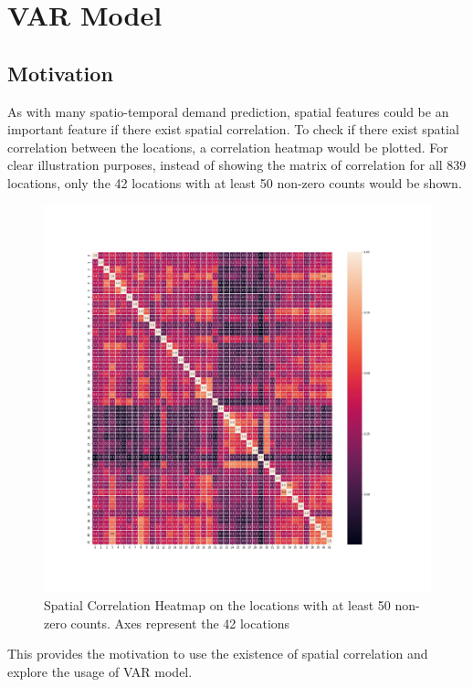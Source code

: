 \documentclass[12pt, letterpaper] {article}
\begin{document}
\section{VAR Model}

\subsection{Motivation}

As with many spatio-temporal demand prediction, spatial features could be an important feature if there exist spatial correlation. To check if there exist spatial correlation between the locations, a correlation heatmap would be plotted. For clear illustration purposes, instead of showing the matrix of correlation for all 839 locations, only the 42 locations with at least 50 non-zero counts would be shown. 

\begin{figure}[H]
    \centering
    \includegraphics[width=\textwidth, height=0.9\textheight]{Images/heatmap.jpg}
    \caption{Spatial Correlation Heatmap on the locations with at least 50 non-zero counts. Axes represent the 42 locations}
    \label{fig:Spatial Correlation Heatmap. Axes represent locations}
\end{figure}

\noindent This provides the motivation to use the existence of spatial correlation and explore the usage of VAR model.
\end{document}
